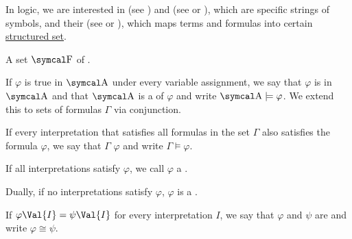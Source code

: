 \begin{definition}\label{def:logic_syntax}
  In logic, we are interested in  (see ) and  (see  or ), which are specific strings of symbols, and their  (see  or ), which maps terms and formulas into certain \hyperref[def:concrete_category]{structured set}.
\end{definition}

\begin{definition}\label{rem:syntax_and_semantics}


  A set \( \CF \) of . 


  \begin{RemEnum}
     If \( \varphi \) is true in \( \CA \) under every variable assignment, we say that \( \varphi \) is  in \( \CA \) and that \( \CA \) is a  of \( \varphi \) and write \( \CA \models \varphi \). We extend this to sets of formulas \( \Gamma \) via conjunction.

     If every interpretation that satisfies all formulas in the set \( \Gamma \) also satisfies the formula \( \varphi \), we say that \( \Gamma \)  \( \varphi \) and write \( \Gamma \models \varphi \).

     If all interpretations satisfy \( \varphi \), we call \( \varphi \) a .

     Dually, if no interpretations satisfy \( \varphi \), \( \varphi \) is a .

     If \( \varphi\Val{I} = \psi\Val{I} \) for every interpretation \( I \), we say that \( \varphi \) and \( \psi \) are  and write \( \varphi \cong \psi \).
  \end{RemEnum}
\end{definition}

